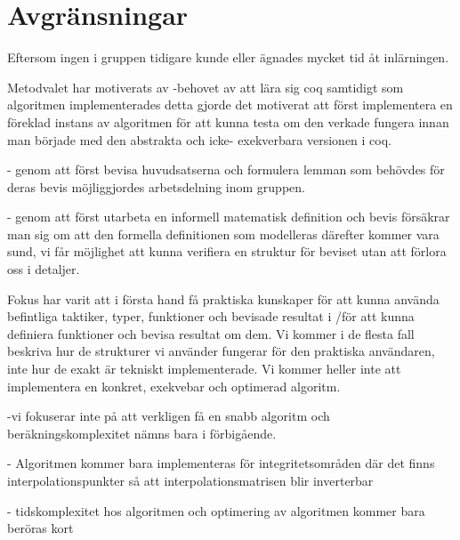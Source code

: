 \section{Avgränsningar}
Eftersom ingen i gruppen tidigare kunde \coq eller \ssr ägnades mycket tid åt
inlärningen.

Metodvalet har motiverats av
-behovet av att lära sig coq samtidigt som algoritmen implementerades
detta gjorde det motiverat att först implementera en föreklad instans av algoritmen för
att kunna testa om den verkade fungera innan man började med den abstrakta och icke-
exekverbara versionen i coq.

- genom att först bevisa huvudsatserna och formulera lemman som behövdes för deras bevis
möjliggjordes arbetsdelning inom gruppen.

- genom att först utarbeta en informell matematisk definition och bevis försäkrar man sig om
att den formella definitionen som modelleras därefter kommer vara sund, vi får möjlighet
att kunna verifiera en struktur för beviset utan att förlora oss i detaljer.

Fokus har varit att i första hand få praktiska kunskaper för att kunna använda
befintliga taktiker, typer, funktioner och bevisade resultat i \coq/\ssr för
att kunna definiera funktioner och bevisa resultat om dem. Vi kommer i de
flesta fall beskriva hur de strukturer vi använder fungerar för den praktiska
användaren, inte hur de exakt är tekniskt implementerade. Vi kommer heller inte
att implementera en konkret, exekvebar och optimerad algoritm.

-vi fokuserar inte på att verkligen få en snabb algoritm och beräkningskomplexitet nämns bara i förbigående.

- Algoritmen kommer bara implementeras för integritetsområden där det finns interpolationspunkter så att
  interpolationsmatrisen blir inverterbar

- tidskomplexitet hos algoritmen och optimering av algoritmen kommer bara beröras kort
